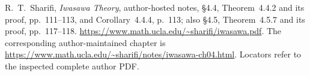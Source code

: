 R.~T.~Sharifi, \emph{Iwasawa Theory}, author-hosted notes,
\S4.4, Theorem~4.4.2 and its proof, pp.~111--113,
and Corollary~4.4.4, p.~113; also \S4.5,
Theorem~4.5.7 and its proof, pp.~117--118.
\url{https://www.math.ucla.edu/~sharifi/iwasawa.pdf}.
The corresponding author-maintained chapter is
\url{https://www.math.ucla.edu/~sharifi/notes/iwasawa-ch04.html}.
Locators refer to the inspected complete author PDF.
